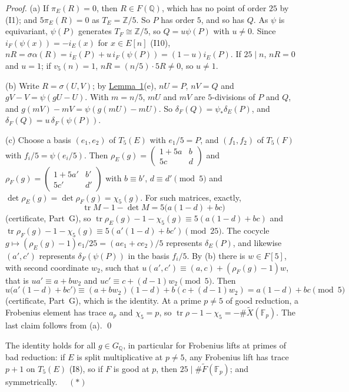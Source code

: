 \documentclass[11pt]{article}
\newcommand{\Q}{\mathbb Q}
\newcommand{\Z}{\mathbb Z}
\newcommand{\F}{\mathbb F}
\DeclareMathOperator{\tr}{tr}
\begin{document}
\emph{Proof.} (a) If \(\pi_E(R)=0\), then \(R\in F(\Q)\), which has no point of order \(25\) by (I1); and
\(5\pi_E(R)=0\) as \(T_E=\Z/5\). So \(P\) has order \(5\), and so has \(Q\). As \(\psi\) is equivariant, \(\psi(P)\)
generates \(T_F\cong\Z/5\), so \(Q=u\psi(P)\) with \(u\neq0\). Since \(i_F(\psi(x))=-i_E(x)\) for \(x\in E[n]\)
(I10), \(nR=\sigma\alpha(R)=i_E(P)+u\,i_F(\psi(P))=(1-u)i_E(P)\). If \(25\mid n\), \(nR=0\) and \(u=1\); if
\(v_5(n)=1\), \(nR=(n/5)\cdot5R\neq0\), so \(u\neq1\).

(b) Write \(R=\sigma(U,V)\); by \hyperref[lemma-gluing]{Lemma~1}(e), \(nU=P\), \(nV=Q\) and \(gV-V=\psi(gU-U)\). With
\(m=n/5\), \(mU\) and \(mV\) are \(5\)-divisions of \(P\) and \(Q\), and \(g(mV)-mV=\psi(g(mU)-mU)\). So
\(\delta_F(Q)=\psi_*\delta_E(P)\), and \(\delta_F(Q)=u\,\delta_F(\psi(P))\).

(c) Choose a basis \((e_1,e_2)\) of \(T_5(E)\) with \(e_1/5=P\), and \((f_1,f_2)\) of \(T_5(F)\) with
\(f_i/5=\psi(e_i/5)\). Then \(\rho_E(g)=\left(\begin{smallmatrix}1+5a&b\\5c&d\end{smallmatrix}\right)\) and
\(\rho_F(g)=\left(\begin{smallmatrix}1+5a'&b'\\5c'&d'\end{smallmatrix}\right)\) with \(b\equiv b'\), \(d\equiv d'\pmod5\)
and \(\det\rho_E(g)=\det\rho_F(g)=\chi_5(g)\). For such matrices, exactly,
\[\tr M-1-\det M=5\bigl(a(1-d)+bc\bigr)\]
(certificate, Part~G), so \(\tr\rho_E(g)-1-\chi_5(g)\equiv5(a(1-d)+bc)\) and \(\tr\rho_F(g)-1-\chi_5(g)\equiv
5(a'(1-d)+bc')\pmod{25}\). The cocycle \(g\mapsto(\rho_E(g)-1)e_1/25=(ae_1+ce_2)/5\) represents \(\delta_E(P)\), and
likewise \((a',c')\) represents \(\delta_F(\psi(P))\) in the basis \(f_i/5\). By (b) there is \(w\in F[5]\), with
second coordinate \(w_2\), such that \(u(a',c')\equiv(a,c)+(\rho_F(g)-1)w\), that is \(ua'\equiv a+bw_2\) and
\(uc'\equiv c+(d-1)w_2\pmod5\). Then
\[u\bigl(a'(1-d)+bc'\bigr)\equiv(a+bw_2)(1-d)+b(c+(d-1)w_2)=a(1-d)+bc\pmod5\]
(certificate, Part~G), which is the identity. At a prime \(p\neq5\) of good reduction, a Frobenius element has trace
\(a_p\) and \(\chi_5=p\), so \(\tr\rho-1-\chi_5=-\#\widetilde X(\F_p)\). The last claim follows from (a). \qed

\medskip
The identity holds for all \(g\in G_{\Q}\), in particular for Frobenius lifts at primes of bad reduction: if
\(E\) is split multiplicative at \(p\neq5\), any Frobenius lift has trace \(p+1\) on \(T_5(E)\) (I8), so if \(F\) is
good at \(p\), then \(25\mid\#\widetilde F(\F_p)\); and symmetrically. \(\quad(\ast)\)
\end{document}
